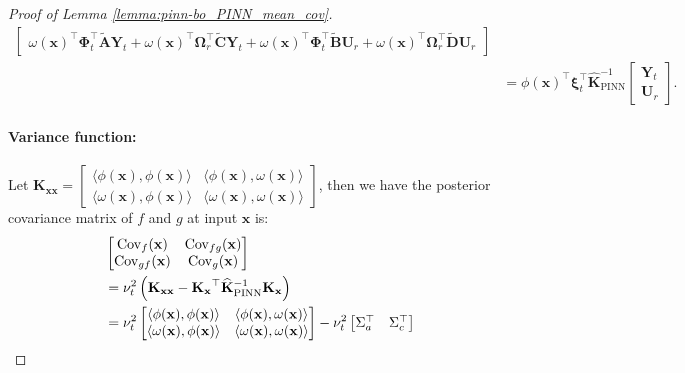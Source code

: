 \begin{proof} [Proof of Lemma \ref{lemma:pinn-bo_PINN_mean_cov}]
\begin{align*}
\begin{bmatrix}
         \omega(\mathbf{x})^\top \boldsymbol{\Phi}_t^\top \widetilde{\mathbf{A}} \mathbf{Y}_t +  \omega(\mathbf{x})^\top \boldsymbol{\Omega}_r ^\top  \widetilde{\mathbf{C}} \mathbf{Y}_t  +\omega(\mathbf{x})^\top \boldsymbol{\Phi}_t^\top \widetilde{\mathbf{B}} \mathbf{U}_r  +  \omega(\mathbf{x})^\top \boldsymbol{\Omega}_r ^\top  \widetilde{\mathbf{D}} \mathbf{U}_r
    \end{bmatrix}
        \\
         &=\phi(\mathbf{x})^\top \boldsymbol{\xi}_t^\top \mathbf{\widehat{K}}_\mathrm{PINN}^{-1} \begin{bmatrix}
         \mathbf{Y}_t \\
         \mathbf{U}_r\end{bmatrix}.
\end{align*}

\paragraph{Variance function:}
Let $\mathbf{K}_{\mathbf{xx}} = \begin{bmatrix}
\langle \phi(\mathbf{x}), \phi(\mathbf{x}) \rangle & \langle \phi(\mathbf{x}), \omega(\mathbf{x}) \rangle \\
\langle \omega(\mathbf{x}), \phi(\mathbf{x}) \rangle & \langle \omega(\mathbf{x}), \omega(\mathbf{x}) \rangle
\end{bmatrix}$, then we have the posterior covariance matrix of $f$ and $g$ at input $\mathbf{x}$ is:
\begin{align*}
    &\begin{bmatrix}
    \mathrm{Cov}_f(\mathbf{x}) & \mathrm{Cov}_{fg}(\mathbf{x}) \\
    \mathrm{Cov}_{gf}(\mathbf{x}) & \mathrm{Cov}_g(\mathbf{x})
\end{bmatrix}  \\
&= \nu_t^2 \left(\mathbf{K}_{\mathbf{xx}} - \mathbf{K_x}^\top \mathbf{\widehat{K}}_\mathrm{PINN}^{-1} \mathbf{K_x} \right) \\
&= \nu_t^2   \begin{bmatrix}
\langle \phi(\mathbf{x}), \phi(\mathbf{x}) \rangle & \langle \phi(\mathbf{x}), \omega(\mathbf{x}) \rangle \notag \\
\langle \omega(\mathbf{x}), \phi(\mathbf{x}) \rangle & \langle \omega(\mathbf{x}), \omega(\mathbf{x}) \rangle
\end{bmatrix} - \nu_t^2
\begin{bmatrix}
        \Sigma_a^\top& \Sigma_c^\top \\

\end{bmatrix}
\end{align*}
\end{proof}
